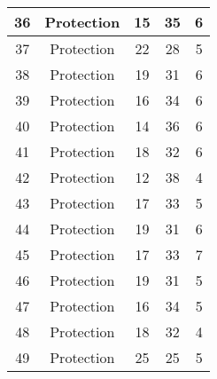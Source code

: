 \documentclass[results.tex]{subfiles}
\begin{document}
\begin{center}
\begin{tabular}{| c || c | c | c | c |}
            \hline
            36                      & Protection                   & 15                     & 35                      & 6                    \\
            \hline
            37                      & Protection                   & 22                     & 28                      & 5                    \\
            \hline
            38                      & Protection                   & 19                     & 31                      & 6                    \\
            \hline
            39                      & Protection                   & 16                     & 34                      & 6                    \\
            \hline
            40                      & Protection                   & 14                     & 36                      & 6                    \\
            \hline
            41                      & Protection                   & 18                     & 32                      & 6                    \\
            \hline
            42                      & Protection                   & 12                     & 38                      & 4                    \\
            \hline
            43                      & Protection                   & 17                     & 33                      & 5                    \\
            \hline
            44                      & Protection                   & 19                     & 31                      & 6                    \\
            \hline
            45                      & Protection                   & 17                     & 33                      & 7                    \\
            \hline
            46                      & Protection                   & 19                     & 31                      & 5                    \\
            \hline
            47                      & Protection                   & 16                     & 34                      & 5                    \\
            \hline
            48                      & Protection                   & 18                     & 32                      & 4                    \\
            \hline
            49                      & Protection                   & 25                     & 25                      & 5                    \\
            \hline
        \end{tabular}
    \end{center}
\end{document}
